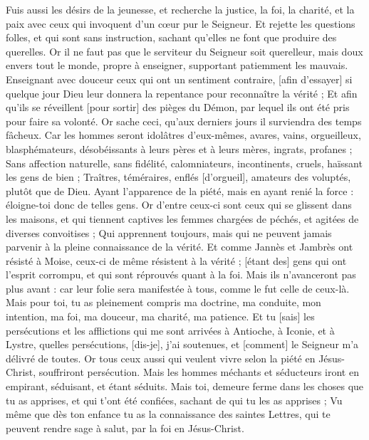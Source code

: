 \begin{multicols}{2}
Fuis aussi les désirs de la jeunesse, et recherche la justice, la foi, la charité, et la paix avec ceux qui invoquent d'un cœur pur le Seigneur.
Et rejette les questions folles, et qui sont sans instruction, sachant qu'elles ne font que produire des querelles.
Or il ne faut pas que le serviteur du Seigneur soit querelleur, mais doux envers tout le monde, propre à enseigner, supportant patiemment les mauvais.
Enseignant avec douceur ceux qui ont un sentiment contraire, [afin d'essayer] si quelque jour Dieu leur donnera la repentance pour reconnaître la vérité ;
Et afin qu'ils se réveillent [pour sortir] des pièges du Démon, par lequel ils ont été pris pour faire sa volonté.
\VerseOne{}Or sache ceci, qu'aux derniers jours il surviendra des temps fâcheux.
Car les hommes seront idolâtres d'eux-mêmes, avares, vains, orgueilleux, blasphémateurs, désobéissants à leurs pères et à leurs mères, ingrats, profanes ;
Sans affection naturelle, sans fidélité, calomniateurs, incontinents, cruels, haïssant les gens de bien ;
Traîtres, téméraires, enflés [d'orgueil], amateurs des voluptés, plutôt que de Dieu.
Ayant l'apparence de la piété, mais en ayant renié la force : éloigne-toi donc de telles gens.
Or d'entre ceux-ci sont ceux qui se glissent dans les maisons, et qui tiennent captives les femmes chargées de péchés, et agitées de diverses convoitises ;
Qui apprennent toujours, mais qui ne peuvent jamais parvenir à la pleine connaissance de la vérité.
Et comme Jannès et Jambrès ont résisté à Moise, ceux-ci de même résistent à la vérité ; [étant des] gens qui ont l'esprit corrompu, et qui sont réprouvés quant à la foi.
Mais ils n'avanceront pas plus avant : car leur folie sera manifestée à tous, comme le fut celle de ceux-là.
Mais pour toi, tu as pleinement compris ma doctrine, ma conduite, mon intention, ma foi, ma douceur, ma charité, ma patience.
Et tu [sais] les persécutions et les afflictions qui me sont arrivées à Antioche, à Iconie, et à Lystre, quelles persécutions, [dis-je], j'ai soutenues, et [comment] le Seigneur m'a délivré de toutes.
Or tous ceux aussi qui veulent vivre selon la piété en Jésus-Christ, souffriront persécution.
Mais les hommes méchants et séducteurs iront en empirant, séduisant, et étant séduits.
Mais toi, demeure ferme dans les choses que tu as apprises, et qui t'ont été confiées, sachant de qui tu les as apprises ;
Vu même que dès ton enfance tu as la connaissance des saintes Lettres, qui te peuvent rendre sage à salut, par la foi en Jésus-Christ.

\end{multicols}
